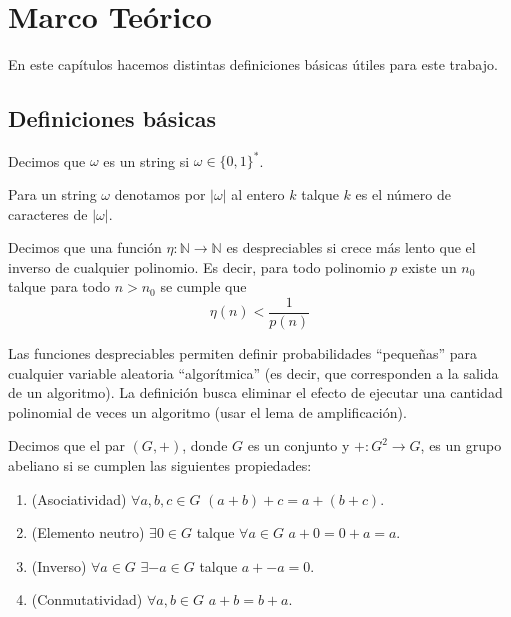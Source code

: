 \chapter{Marco Teórico}

En este capítulos hacemos distintas definiciones básicas útiles
para este trabajo.

\section{Definiciones básicas}

\begin{definicion}[String]
Decimos que $\omega$ es un string si $\omega \in \{0,1\}^*$.
\end{definicion}

\begin{definicion}
Para un string $\omega$ denotamos por $|\omega|$ al entero $k$
talque $k$ es el número de caracteres de $|\omega|$.
\end{definicion}

\begin{definicion}
Decimos que una función $\eta: \mathbb{N} \to \mathbb{N}$ es despreciables
si crece más lento que el inverso de cualquier polinomio. Es decir, para
todo polinomio $p$ existe
un $n_0$ talque para todo $n > n_0$ se cumple que
$$\eta(n) < \frac{1}{p(n)}$$
\end{definicion}
Las funciones despreciables permiten definir probabilidades ``pequeñas'' para cualquier
variable aleatoria ``algorítmica'' (es decir, que corresponden a la salida de un algoritmo).
La definición busca eliminar el efecto de ejecutar una cantidad polinomial de veces un
algoritmo (usar el lema de amplificación).

\begin{definicion}
Decimos que el par $(G,+)$, donde $G$ es un conjunto y
$+:G^2 \to G$, es un grupo abeliano si se cumplen las siguientes propiedades:
\begin{enumerate}
\item (Asociatividad) $\forall a,b,c \in G$ $(a+b)+c=a+(b+c)$.
\item (Elemento neutro) $\exists 0 \in G$ talque $\forall a \in G$ $a+0 = 0+a = a$.
\item (Inverso) $\forall a \in G$ $\exists -a \in G$ talque $a+-a = 0$.
\item (Conmutatividad) $\forall a,b \in G$ $a+b = b+a$.
\end{enumerate}
\end{definicion}

